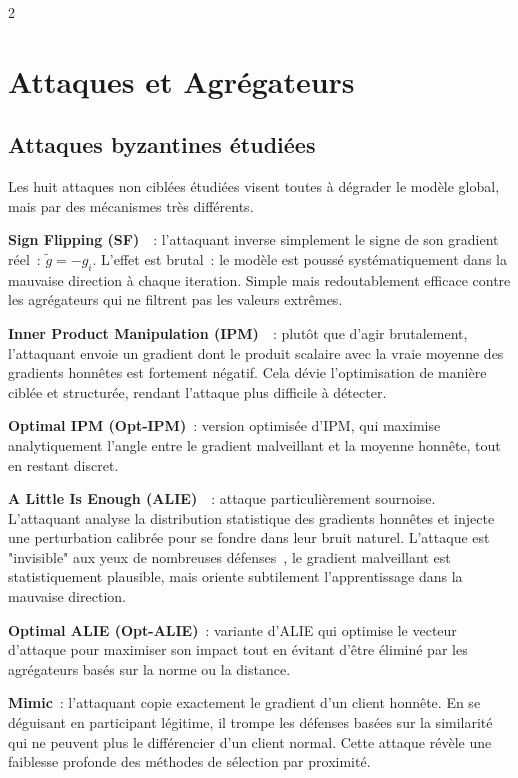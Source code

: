 \documentclass{article}
\begin{document}
\begin{multicols}{2}
\section{Attaques et Agr\'egateurs}

\subsection{Attaques byzantines \'etudi\'ees}

Les huit attaques non cibl\'ees \'etudi\'ees visent toutes \`a d\'egrader le mod\`ele global,
mais par des m\'ecanismes tr\`es diff\'erents.

\textbf{Sign Flipping (SF)}~\cite{li2019}~: l'attaquant inverse simplement le signe de son gradient
r\'eel~: $\tilde{g} = -g_i$. L'effet est brutal~: le mod\`ele est pouss\'e syst\'ematiquement
dans la mauvaise direction \`a chaque iteration. Simple mais redoutablement efficace contre
les agr\'egateurs qui ne filtrent pas les valeurs extr\^emes.

\textbf{Inner Product Manipulation (IPM)}~\cite{xie2020}~: plut\^ot que d'agir brutalement,
l'attaquant envoie un gradient dont le produit scalaire avec la vraie moyenne des gradients
honnêtes est fortement n\'egatif. Cela d\'evie l'optimisation de mani\`ere cibl\'ee et structur\'ee,
rendant l'attaque plus difficile \`a d\'etecter.

\textbf{Optimal IPM (Opt-IPM)}~: version optimis\'ee d'IPM, qui maximise analytiquement
l'angle entre le gradient malveillant et la moyenne honnête, tout en restant discret.

\textbf{A Little Is Enough (ALIE)}~\cite{baruch2019}~: attaque particuli\`erement
sournoise. L'attaquant analyse la distribution statistique des gradients honnêtes et
injecte une perturbation calibr\'ee pour se fondre dans leur bruit naturel. L'attaque
est "invisible" aux yeux de nombreuses d\'efenses~, le gradient malveillant est
statistiquement plausible, mais oriente subtilement l'apprentissage dans la mauvaise direction.

\textbf{Optimal ALIE (Opt-ALIE)}~: variante d'ALIE qui optimise le vecteur d'attaque
pour maximiser son impact tout en \'evitant d'\^etre \'elimin\'e par les agr\'egateurs
bas\'es sur la norme ou la distance.

\textbf{Mimic}~: l'attaquant copie exactement le gradient d'un client honnête. En se
d\'eguisant en participant l\'egitime, il trompe les d\'efenses bas\'ees sur la similarit\'e qui ne peuvent plus le diff\'erencier d'un client normal. Cette attaque
r\'ev\`ele une faiblesse profonde des m\'ethodes de s\'election par proximit\'e.


\end{multicols}
\end{document}
